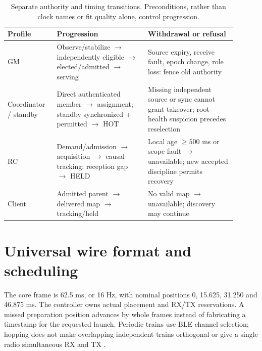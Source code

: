 \documentclass[11pt,letterpaper]{article}
\begin{document}
\begin{table}[htbp]\centering\small
\caption{Separate authority and timing transitions. Preconditions, rather than clock names or fit quality alone, control progression.}
\begin{tabular}{@{}L{0.19\linewidth}L{0.36\linewidth}L{0.35\linewidth}@{}}\toprule
Profile & Progression & Withdrawal or refusal\\\midrule
GM & Observe/stabilize $\rightarrow$ independently eligible $\rightarrow$ elected/admitted $\rightarrow$ serving & Source expiry, receive fault, epoch change, role loss: fence old authority\\
Coordinator / standby & Direct authenticated member $\rightarrow$ assignment; standby synchronized + permitted $\rightarrow$ HOT & Missing independent source or sync cannot grant takeover; root-health suspicion precedes reselection\\
RC & Demand/admission $\rightarrow$ acquisition $\rightarrow$ causal tracking; reception gap $\rightarrow$ HELD & Local age $\ge500$ ms or scope fault $\rightarrow$ unavailable; new accepted discipline permits recovery\\
Client & Admitted parent $\rightarrow$ delivered map $\rightarrow$ tracking/held & No valid map $\rightarrow$ unavailable; discovery may continue\\\bottomrule
\end{tabular}
\end{table}

\section{Universal wire format and scheduling}\label{sec:wire}
The core frame is 62.5 ms, or 16 Hz, with nominal positions 0, 15.625, 31.250 and 46.875 ms. The controller owns actual placement and RX/TX reservations. A missed preparation position advances by whole frames instead of fabricating a timestamp for the requested launch. Periodic trains use BLE channel selection; hopping does not make overlapping independent trains orthogonal or give a single radio simultaneous RX and TX \cite{ble}.
\end{document}
